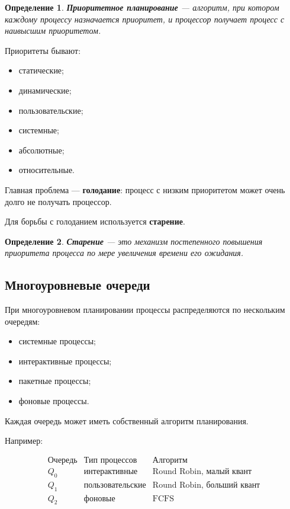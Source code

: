 \documentclass[12pt,a4paper]{article}
\newtheorem{definition}{Определение}
\begin{document}
\begin{definition}
\textbf{Приоритетное планирование} --- алгоритм, при котором каждому процессу назначается приоритет, и процессор получает процесс с наивысшим приоритетом.
\end{definition}

Приоритеты бывают:

\begin{itemize}
    \item статические;
    \item динамические;
    \item пользовательские;
    \item системные;
    \item абсолютные;
    \item относительные.
\end{itemize}

Главная проблема --- \textbf{голодание}: процесс с низким приоритетом может очень долго не получать процессор.

Для борьбы с голоданием используется \textbf{старение}.

\begin{definition}
\textbf{Старение} --- это механизм постепенного повышения приоритета процесса по мере увеличения времени его ожидания.
\end{definition}

\subsection{Многоуровневые очереди}

При многоуровневом планировании процессы распределяются по нескольким очередям:

\begin{itemize}
    \item системные процессы;
    \item интерактивные процессы;
    \item пакетные процессы;
    \item фоновые процессы.
\end{itemize}

Каждая очередь может иметь собственный алгоритм планирования.

Например:

\[
\begin{array}{c|c|c}
\text{Очередь} & \text{Тип процессов} & \text{Алгоритм} \\
\hline
Q_0 & \text{интерактивные} & \text{Round Robin, малый квант} \\
Q_1 & \text{пользовательские} & \text{Round Robin, больший квант} \\
Q_2 & \text{фоновые} & \text{FCFS}
\end{array}
\]
\end{document}
